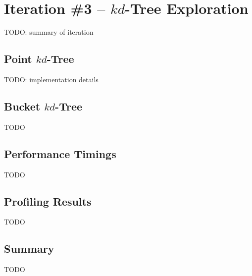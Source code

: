 \section{Iteration \#3 -- $kd$-Tree Exploration}

TODO: summary of iteration

\subsection{Point $kd$-Tree}

TODO: implementation details

\subsection{Bucket $kd$-Tree}

TODO

\subsection{Performance Timings}

TODO

\subsection{Profiling Results}

TODO

\subsection{Summary}

TODO